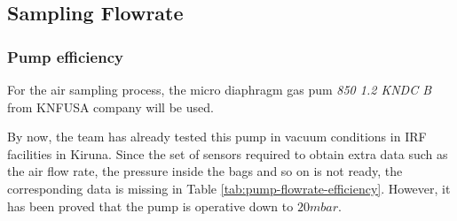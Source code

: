 \subsection{Sampling Flowrate}


\subsubsection{Pump efficiency}

For the air sampling process, the micro diaphragm gas pum \emph{850 1.2 KNDC B} from KNFUSA company will be used.

By now, the team has already tested this pump in vacuum conditions in IRF facilities in Kiruna. Since the set of sensors required to obtain extra data such as the air flow rate, the pressure inside the bags and so on is not ready, the corresponding data is missing in Table \ref{tab:pump-flowrate-efficiency}. However, it has been proved that the pump is operative down to $20 mbar$.

